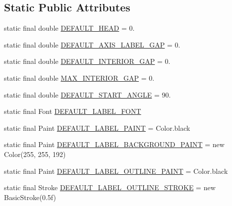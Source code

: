 \subsection*{Static Public Attributes}
\begin{DoxyCompactItemize}
\item 
static final double \mbox{\hyperlink{classorg_1_1jfree_1_1chart_1_1plot_1_1_spider_web_plot_adedcafcb340bcd852399bedbb8151a97}{D\+E\+F\+A\+U\+L\+T\+\_\+\+H\+E\+AD}} = 0.
\item 
static final double \mbox{\hyperlink{classorg_1_1jfree_1_1chart_1_1plot_1_1_spider_web_plot_aa807ee62569ce7f63f7cb330e72bb695}{D\+E\+F\+A\+U\+L\+T\+\_\+\+A\+X\+I\+S\+\_\+\+L\+A\+B\+E\+L\+\_\+\+G\+AP}} = 0.
\item 
static final double \mbox{\hyperlink{classorg_1_1jfree_1_1chart_1_1plot_1_1_spider_web_plot_ad2dec1e637997739c311116f79e0c357}{D\+E\+F\+A\+U\+L\+T\+\_\+\+I\+N\+T\+E\+R\+I\+O\+R\+\_\+\+G\+AP}} = 0.
\item 
static final double \mbox{\hyperlink{classorg_1_1jfree_1_1chart_1_1plot_1_1_spider_web_plot_ade44564be7b66884622b44f02b51475e}{M\+A\+X\+\_\+\+I\+N\+T\+E\+R\+I\+O\+R\+\_\+\+G\+AP}} = 0.
\item 
static final double \mbox{\hyperlink{classorg_1_1jfree_1_1chart_1_1plot_1_1_spider_web_plot_a4a178098a02f016c398e72fb530bea11}{D\+E\+F\+A\+U\+L\+T\+\_\+\+S\+T\+A\+R\+T\+\_\+\+A\+N\+G\+LE}} = 90.
\item 
static final Font \mbox{\hyperlink{classorg_1_1jfree_1_1chart_1_1plot_1_1_spider_web_plot_abc9d7cdafff8c14faffd12f0fb1c7879}{D\+E\+F\+A\+U\+L\+T\+\_\+\+L\+A\+B\+E\+L\+\_\+\+F\+O\+NT}}
\item 
static final Paint \mbox{\hyperlink{classorg_1_1jfree_1_1chart_1_1plot_1_1_spider_web_plot_affe2e20f3ac56f689cc342609e2a0d62}{D\+E\+F\+A\+U\+L\+T\+\_\+\+L\+A\+B\+E\+L\+\_\+\+P\+A\+I\+NT}} = Color.\+black
\item 
static final Paint \mbox{\hyperlink{classorg_1_1jfree_1_1chart_1_1plot_1_1_spider_web_plot_a54de55feec393d53f34909cff97deba0}{D\+E\+F\+A\+U\+L\+T\+\_\+\+L\+A\+B\+E\+L\+\_\+\+B\+A\+C\+K\+G\+R\+O\+U\+N\+D\+\_\+\+P\+A\+I\+NT}} = new Color(255, 255, 192)
\item 
static final Paint \mbox{\hyperlink{classorg_1_1jfree_1_1chart_1_1plot_1_1_spider_web_plot_aa4d4934f23fd2a1f1d8cf3eb9c925a6e}{D\+E\+F\+A\+U\+L\+T\+\_\+\+L\+A\+B\+E\+L\+\_\+\+O\+U\+T\+L\+I\+N\+E\+\_\+\+P\+A\+I\+NT}} = Color.\+black
\item 
static final Stroke \mbox{\hyperlink{classorg_1_1jfree_1_1chart_1_1plot_1_1_spider_web_plot_ac1c112a80cb204703e6a1a1f6f424189}{D\+E\+F\+A\+U\+L\+T\+\_\+\+L\+A\+B\+E\+L\+\_\+\+O\+U\+T\+L\+I\+N\+E\+\_\+\+S\+T\+R\+O\+KE}} = new Basic\+Stroke(0.\+5f)

\end{DoxyCompactItemize}

